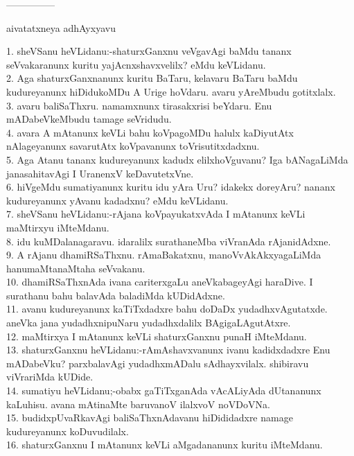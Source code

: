 \documentclass{article}
\begin{document}
\begin{center}
---------------
\end{center}

\begin{center}
aivatatxneya adhAyxyavu
\end{center}

1. sheVSanu heVLidanu:-shaturxGanxnu veVgavAgi baMdu tananx seVvakaranunx kuritu yajAcnxshavxvelilx? eMdu keVLidanu.\\
2. Aga shaturxGanxnanunx kuritu BaTaru, kelavaru BaTaru baMdu kudureyanunx hiDidukoMDu A Urige hoVdaru. avaru yAreMbudu gotitxlalx.\\
3. avaru baliSaThxru. namamxnunx tirasakxrisi beYdaru. Enu mADabeVkeMbudu tamage seVridudu.\\
4. avara A mAtanunx keVLi bahu koVpagoMDu halulx kaDiyutAtx nAlageyanunx savarutAtx koVpavanunx toVrisutitxdadxnu.\\
5. Aga Atanu tananx kudureyanunx kadudx elilxhoVguvanu? Iga bANagaLiMda janasahitavAgi I UranenxV keDavutetxVne.\\
6. hiVgeMdu sumatiyanunx kuritu idu yAra Uru? idakekx doreyAru? nananx kudureyanunx yAvanu kadadxnu? eMdu keVLidanu.\\
7. sheVSanu heVLidanu:-rAjana koVpayukatxvAda I mAtanunx keVLi maMtirxyu iMteMdanu.\\
8. idu kuMDalanagaravu. idaralilx surathaneMba viVranAda rAjanidAdxne.\\
9. A rAjanu dhamiRSaThxnu. rAmaBakatxnu, manoVvAkAkxyagaLiMda hanumaMtanaMtaha seVvakanu.\\
10. dhamiRSaThxnAda ivana cariterxgaLu aneVkabageyAgi haraDive. I surathanu bahu balavAda baladiMda kUDidAdxne.\\
11. avanu kudureyanunx kaTiTxdadxre bahu doDaDx yudadhxvAgutatxde. aneVka jana yudadhxnipuNaru yudadhxdalilx BAgigaLAgutAtxre.\\
12. maMtirxya I mAtanunx keVLi shaturxGanxnu punaH iMteMdanu.\\
13. shaturxGanxnu heVLidanu:-rAmAshavxvanunx ivanu kadidxdadxre Enu mADabeVku? parxbalavAgi yudadhxmADalu sAdhayxvilalx. shibiravu viVrariMda kUDide.\\
14. sumatiyu heVLidanu;-obabx gaTiTxganAda vAcALiyAda dUtananunx kaLuhisu. avana mAtinaMte baruvanoV ilalxvoV noVDoVNa.\\
15. budidxpUvaRkavAgi baliSaThxnAdavanu hiDididadxre namage kudureyanunx koDuvudilalx.\\
16. shaturxGanxnu I mAtanunx keVLi aMgadananunx kuritu iMteMdanu.\\
\end{document}
